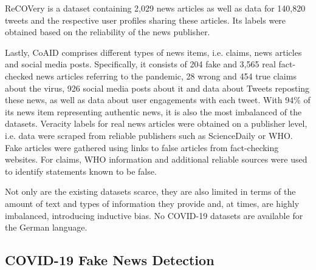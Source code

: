 \documentclass[11pt]{article}
\begin{document}
ReCOVery \citep{DBLP:journals/corr/abs-2006-05557} is a dataset containing 2,029 news articles as well as data for 140,820 tweets and the respective user profiles sharing these articles. Its labels were obtained based on the reliability of the news publisher.

Lastly, CoAID \citep{2020arXiv200600885C} comprises different types of news items, i.e. claims, news articles and social media posts. Specifically, it consists of 204 fake and 3,565 real fact-checked news articles referring to the pandemic, 28 wrong and 454 true claims about the virus, 926 social media posts about it and data about Tweets reposting these news, as well as data about user engagements with each tweet. With 94\% of its news item representing authentic news, it is also the most imbalanced of the datasets. Veracity labels for real news articles were obtained on a publisher level, i.e. data were scraped from reliable publishers such as ScienceDaily or WHO. Fake articles were gathered using links to false articles from fact-checking websites. For claims, WHO information and additional reliable sources were used to identify statements known to be false.

Not only are the existing datasets scarce, they are also limited in terms of the amount of text and types of information they provide and, at times, are highly imbalanced, introducing inductive bias. No COVID-19 datasets are available for the German language.


\subsection{COVID-19 Fake News Detection}
\end{document}

